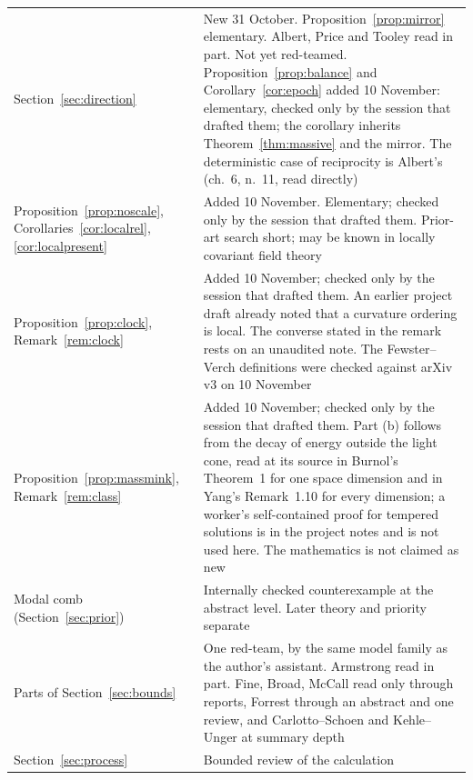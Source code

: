 \documentclass[11pt]{article}
\theoremstyle{definition}
\begin{document}
\begin{center}
\begin{tabularx}{\textwidth}{@{}lY@{}}
Section~\ref{sec:direction} & New 31 October. Proposition~\ref{prop:mirror} elementary. Albert, Price and Tooley read in part. Not yet red-teamed. Proposition~\ref{prop:balance} and Corollary~\ref{cor:epoch} added 10 November: elementary, checked only by the session that drafted them; the corollary inherits Theorem~\ref{thm:massive} and the mirror. The deterministic case of reciprocity is Albert's (ch.~6, n.~11, read directly)\\
Proposition~\ref{prop:noscale}, Corollaries~\ref{cor:localrel}, \ref{cor:localpresent} & Added 10 November. Elementary; checked only by the session that drafted them. Prior-art search short; may be known in locally covariant field theory\\
Proposition~\ref{prop:clock}, Remark~\ref{rem:clock} & Added 10 November; checked only by the session that drafted them. An earlier project draft already noted that a curvature ordering is local. The converse stated in the remark rests on an unaudited note. The Fewster--Verch definitions were checked against arXiv v3 on 10 November\\
Proposition~\ref{prop:massmink}, Remark~\ref{rem:class} & Added 10 November; checked only by the session that drafted them. Part (b) follows from the decay of energy outside the light cone, read at its source in Burnol's Theorem~1 for one space dimension and in Yang's Remark~1.10 for every dimension; a worker's self-contained proof for tempered solutions is in the project notes and is not used here. The mathematics is not claimed as new\\
Modal comb (Section~\ref{sec:prior}) & Internally checked counterexample at the abstract level. Later theory and priority separate\\
Parts of Section~\ref{sec:bounds} & One red-team, by the same model family as the author's assistant. Armstrong read in part. Fine, Broad, McCall read only through reports, Forrest through an abstract and one review, and Carlotto--Schoen and Kehle--Unger at summary depth\\
Section~\ref{sec:process} & Bounded review of the calculation\\
\bottomrule
\end{tabularx}
\end{center}
\end{document}
